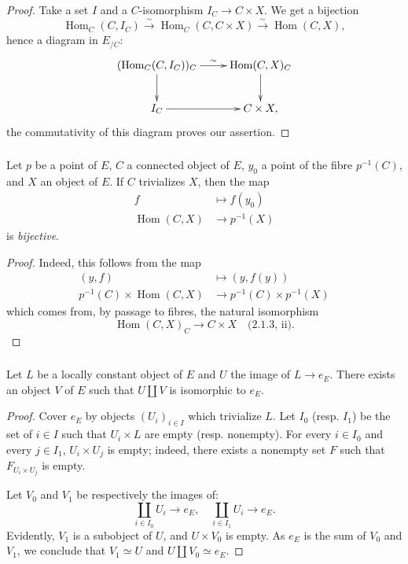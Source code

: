 \documentclass[10pt,oneside]{amsart}
\newcommand{\oldpage}[1]{\marginnote{\textbf{#1}}}
\DeclareMathOperator{\Hom}{Hom}
\begin{document}
\begin{proof}
Take a set $I$ and a $C$-isomorphism $I_C\to C\times X$.
We get a bijection
\[
  \Hom_C(C,I_C)\xrightarrow{~\sim~}\Hom_C(C,C\times X)\xrightarrow{~\sim~}\Hom(C,X),
\]
hence a diagram in $E_{/C}$:
\[
  \xymatrix{
    (\Hom_C(C,I_C))_C\ar[r]^-\sim\ar[d] & \Hom(C,X)_C\ar[d]\\
    I_C\ar[r] & C\times X,
  }
\]
the commutativity of this diagram proves our assertion.
\end{proof}

\subsubsection{}
\oldpage{7}
Let $p$ be a point of $E$, $C$ a connected object of $E$, $y_0$ a point of the fibre $p^{-1}(C)$, and $X$ an object of $E$.
If $C$ trivializes $X$, then the map
\begin{align*}
  f & \longmapsto f(y_0)\\
  \Hom(C,X) & \longrightarrow p^{-1}(X)
\end{align*}
is \emph{bijective}.

\begin{proof}
Indeed, this follows from the map
\begin{align*}
  (y,f) & \longmapsto (y,f(y))\\
  p^{-1}(C)\times\Hom(C,X) & \longrightarrow p^{-1}(C)\times p^{-1}(X)
\end{align*}
which comes from, by passage to fibres, the natural isomorphism
\[
  \Hom(C,X)_C\longrightarrow C\times X\quad\text{(2.1.3, ii)}.
\]
\end{proof}

\subsubsection{}
Let $L$ be a locally constant object of $E$ and $U$ the image of $L\to e_E$.
There exists an object $V$ of $E$ such that $U\amalg V$ is isomorphic to $e_E$.

\begin{proof}
Cover $e_E$ by objects $(U_i)_{i\in I}$ which trivialize $L$.
Let $I_0$ (resp. $I_1$) be the set of $i\in I$ such that $U_i\times L$ are empty (resp. nonempty).
For every $i\in I_0$ and every $j\in I_1$, $U_i\times U_j$ is empty;
indeed, there exists a nonempty set $F$ such that $F_{U_i\times U_j}$ is empty.

Let $V_0$ and $V_1$ be respectively the images of:
\[
  \coprod_{i\in I_0}U_i\longrightarrow e_E,\quad\coprod_{i\in I_1}U_i\longrightarrow e_E.
\]
Evidently, $V_1$ is a subobject of $U$, and $U\times V_0$ is empty.
As $e_E$ is the sum of $V_0$ and $V_1$, we conclude that $V_1\simeq U$ and $U\amalg V_0\simeq e_E$.
\end{proof}
\end{document}
